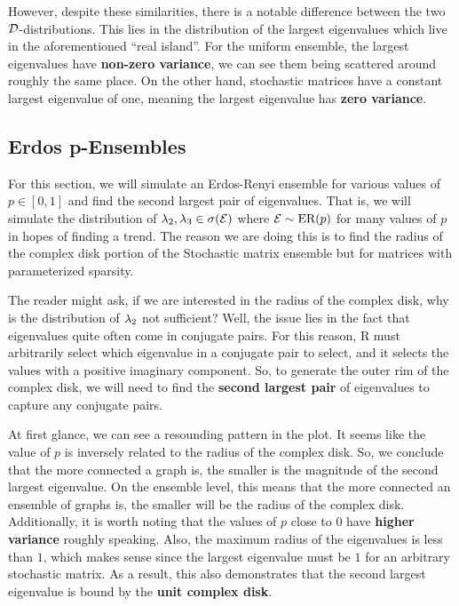 However, despite these similarities, there is a notable difference between the two $\mathcal{D}$-distributions. This lies in the distribution of the largest eigenvalues which live in the aforementioned ``real island''. For the uniform ensemble, the largest eigenvalues have \textbf{non-zero variance}, we can see them being scattered around roughly the same place. On the other hand, stochastic matrices have a constant largest eigenvalue of one, meaning the largest eigenvalue has \textbf{zero variance}.

\newpage

\subsection{Erdos p-Ensembles}

For this section, we will simulate an Erdos-Renyi ensemble for various values of $p \in [0,1]$ and find the second largest pair of eigenvalues.
That is, we will simulate the distribution of $\lambda_2,\lambda_3 \in \sigma(\mathcal{E})$ where $\mathcal{E} \sim \text{ER}(p)$ for many values of $p$ in hopes of finding a trend.
The reason we are doing this is to find the radius of the complex disk portion of the Stochastic matrix ensemble but for matrices with parameterized sparsity.

\begin{remark}
  The reader might ask, if we are interested in the radius of the complex disk, why is the distribution of $\lambda_2$ not sufficient? Well, the issue lies in the fact that eigenvalues quite often come in conjugate pairs. For this reason, R must arbitrarily select which eigenvalue in a conjugate pair to select, and it selects the values with a positive imaginary component. So, to generate the outer rim of the complex disk, we will need to find the \textbf{second largest pair} of eigenvalues to capture any conjugate pairs.
\end{remark}


At first glance, we can see a resounding pattern in the plot. It seems like the value of $p$ is inversely related to the radius of the complex disk. So, we conclude that the more connected a graph is, the smaller is the magnitude of the second largest eigenvalue. On the ensemble level, this means that the more connected an ensemble of graphs is, the smaller will be the radius of the complex disk. Additionally, it is worth noting that the values of $p$ close to $0$ have \textbf{higher variance} roughly speaking. Also, the maximum radius of the eigenvalues is less than $1$, which makes sense since the largest eigenvalue must be $1$ for an arbitrary stochastic matrix. As a result, this also demonstrates that the second largest eigenvalue is bound by the \textbf{unit complex disk}.

